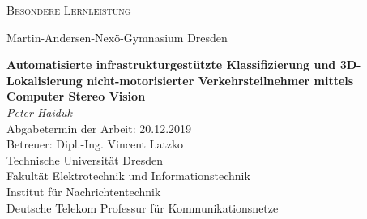 \centering
\vfill

{\scshape\Large Besondere Lernleistung}\kleinerabstand

Martin-Andersen-Nexö-Gymnasium Dresden

\vspace{1.5cm}
{\huge\bfseries Automatisierte infrastrukturgestützte Klassifizierung und 3D-Lokalisierung nicht-motorisierter Verkehrsteilnehmer mittels Computer Stereo Vision\\}
\vspace{2cm}
{\Large\itshape Peter Haiduk\\}
\vspace{1cm}
Abgabetermin der Arbeit: 20.12.2019\\
\vfill
Betreuer: Dipl.-Ing. Vincent Latzko\\[0.3cm]
{\scriptsize Technische Universität Dresden\\
Fakultät Elektrotechnik und Informationstechnik\\
Institut für Nachrichtentechnik\\
Deutsche Telekom Professur für Kommunikationsnetze\\}
\vfill

